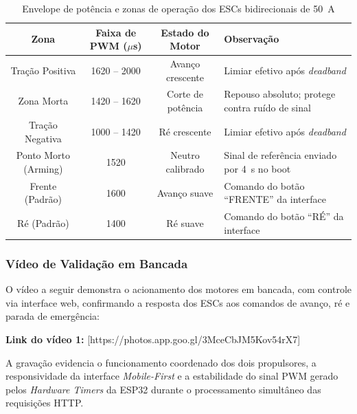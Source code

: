 \documentclass[12pt,a4paper]{article}
\begin{document}
\begin{table}[H]
\centering
\caption{Envelope de potência e zonas de operação dos ESCs bidirecionais de 50~A}
\label{tab:envelope_pwm}
\renewcommand{\arraystretch}{1.3}
\begin{tabularx}{\textwidth}{|c|c|c|X|}
\hline
\rowcolor{gray!20}
\textbf{Zona} & \textbf{Faixa de PWM ($\mu$s)} & \textbf{Estado do Motor} & \textbf{Observação} \\ \hline
Tração Positiva & 1620 -- 2000 & Avanço crescente & Limiar efetivo após \textit{deadband} \\ \hline
\rowcolor{gray!10}
Zona Morta & 1420 -- 1620 & Corte de potência & Repouso absoluto; protege contra ruído de sinal \\ \hline
Tração Negativa & 1000 -- 1420 & Ré crescente & Limiar efetivo após \textit{deadband} \\ \hline
\rowcolor{gray!10}
Ponto Morto (Arming) & 1520 & Neutro calibrado & Sinal de referência enviado por 4~s no boot \\ \hline
Frente (Padrão) & 1600 & Avanço suave & Comando do botão ``FRENTE'' da interface \\ \hline
\rowcolor{gray!10}
Ré (Padrão) & 1400 & Ré suave & Comando do botão ``RÉ'' da interface \\ \hline
\end{tabularx}
\end{table}

\subsubsection{Vídeo de Validação em Bancada}

O vídeo a seguir demonstra o acionamento dos motores em bancada, com controle via interface web, confirmando a resposta dos ESCs aos comandos de avanço, ré e parada de emergência:

\begin{center}
\textbf{Link do vídeo 1:} {\color{blue} [https://photos.app.goo.gl/3MceCbJM5Kov54rX7]}
\end{center}


\noindent A gravação evidencia o funcionamento coordenado dos dois propulsores, a responsividade da interface \textit{Mobile-First} e a estabilidade do sinal PWM gerado pelos \textit{Hardware Timers} da ESP32 durante o processamento simultâneo das requisições HTTP.


\end{document}
